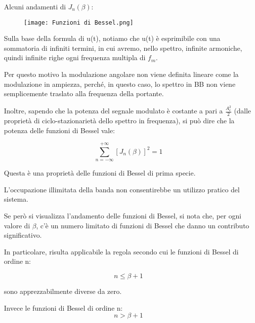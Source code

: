 Alcuni andamenti di $J_n (\beta)$: 

\begin{figure}[h]
    \centering
    \texttt{[image: Funzioni di Bessel.png]}
\end{figure}

Sulla base della formula di u(t), notiamo che u(t) è esprimibile con una sommatoria di infiniti termini, 
in cui avremo, nello spettro, infinite armoniche, quindi infinite righe ogni frequenza multipla di $f_m$. \newline 

Per questo motivo la modulazione angolare non viene definita lineare come la modulazione in ampiezza, 
perché, in questo caso, lo spettro in BB non viene semplicemente traslato alla frequenza della portante. \newline 

Inoltre, sapendo che la potenza del segnale modulato è costante a pari a $\frac{A_c ^{2}}{2}$ (dalle proprietà di ciclo-stazionarietà dello spettro in frequenza), 
si può dire che la potenza delle funzioni di Bessel vale: 

{
    \Large 
    \begin{equation}
        \sum_{n = - \infty}^{+ \infty}
        \left[ J_n (\beta)\right]^{2} = 1
    \end{equation}
}

Questa è una proprietà delle funzioni di Bessel di prima specie. \newline 

L'occupazione illimitata della banda non consentirebbe un utilizzo pratico del sistema. \newline 

Se però si visualizza l'andamento delle funzioni di Bessel, si nota che, per ogni valore di $\beta$, 
c'è un numero limitato di funzioni di Bessel che danno un contributo significativo. \newline 

In particolare, risulta applicabile la regola secondo cui le funzioni di Bessel di ordine n: 

{
    \Large 
    \begin{equation}
        n \le \beta + 1
    \end{equation}
}

sono apprezzabilmente diverse da zero. \newline 

Invece le funzioni di Bessel di ordine n: 
{
    \Large 
    \begin{equation}
        n > \beta + 1
    \end{equation}
} 

